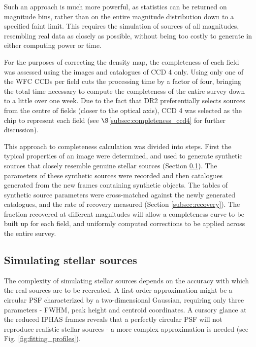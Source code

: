 \documentclass[a4paper,useAMS,usenatbib]{mn2e}
\begin{document}
Such an approach is much more powerful, as statistics can be returned on
magnitude bins, rather than on the entire magnitude distribution down to a
specified faint limit. This requires the simulation of sources of all
magnitudes, resembling real data as closely as possible, without being too
costly to generate in either computing power or time.

For the purposes of correcting the density map, the completeness of each field
was assessed using the images and catalogues of CCD 4 only. Using only one of
the WFC CCDs per field cuts the processing time by a factor of four, bringing
the total time necessary to compute the completeness of the entire survey down
to a little over one week. Due to the fact that DR2 preferentially selects
sources from the centre of fields (closer to the optical axis), CCD 4 was
selected as the chip to represent each field (see $\S$\ref{subsec:completeness_ccd4} for further discussion).

This approach to completeness calculation was divided into steps. First the
typical properties of an image were determined, and used to generate synthetic
sources that closely resemble genuine stellar sources (Section \ref{subsec:artificial_sources}). The parameters of these synthetic sources were recorded and then catalogues generated from the new frames containing synthetic objects. The tables of synthetic source parameters were cross-matched against the newly generated catalogues, and the rate of recovery measured (Section \ref{subsec:recovery}). The fraction recovered at different magnitudes will allow a completeness curve to be built up for each field, and uniformly computed
corrections to be applied across the entire survey.

\subsection{Simulating stellar sources}
\label{subsec:artificial_sources}
The complexity of simulating stellar sources depends on the accuracy with which
the real sources are to be recreated. A first order approximation might be a
circular PSF characterized by a two-dimensional Gaussian, requiring only three
parameters - FWHM, peak height and centroid coordinates. A cursory glance at the reduced IPHAS frames reveals that a perfectly circular PSF will not reproduce realistic stellar sources - a more complex approximation is needed (see Fig. \ref{fig:fitting_profiles}).
\end{document}

